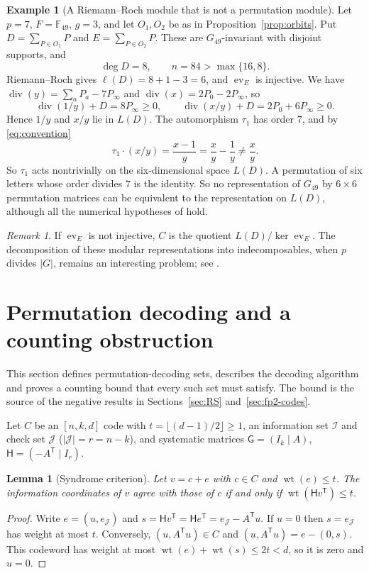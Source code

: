 \documentclass[12pt,letterpaper]{article}
\newtheorem{lemma}[theorem]{Lemma}
\theoremstyle{definition}
\newtheorem{example}[theorem]{Example}
\theoremstyle{remark}
\newtheorem{remark}[theorem]{Remark}
\numberwithin{equation}{section}
\newcommand{\F}{\mathbb{F}}
\newcommand{\ev}{\operatorname{ev}}
\newcommand{\wt}{\operatorname{wt}}
\newcommand{\Gsys}{\mathsf{G}}
\newcommand{\Hsys}{\mathsf{H}}
\newcommand{\cI}{\mathcal{I}}
\newcommand{\cJ}{\mathcal{J}}
\begin{document}
\begin{example}[A Riemann--Roch module that is not a permutation module]
\label{ex:not-permutation}
Let $p=7$, $F=\F_{49}$, $g=3$, and let $O_1,O_2$ be as in
Proposition~\ref{prop:orbits}.  Put $D=\sum_{P\in O_1}P$ and
$E=\sum_{P\in O_2}P$.  These are $G_{49}$-invariant with disjoint
supports, and
\[
\deg D=8,\qquad n=84>\max\{16,8\}.
\]
Riemann--Roch gives $\ell(D)=8+1-3=6$, and $\ev_E$ is injective.  We have
$\operatorname{div}(y)=\sum_aP_a-7P_\infty$ and
$\operatorname{div}(x)=2P_0-2P_\infty$, so
\[
\operatorname{div}(1/y)+D=8P_\infty\ge0,\qquad
\operatorname{div}(x/y)+D=2P_0+6P_\infty\ge0.
\]
Hence $1/y$ and $x/y$ lie in $L(D)$.  The automorphism $\tau_1$ has
order $7$, and by \eqref{eq:convention}
\[
\tau_1\cdot(x/y)=\frac{x-1}{y}=\frac xy-\frac1y\ne\frac xy.
\]
So $\tau_1$ acts nontrivially on the six-dimensional space $L(D)$.  A
permutation of six letters whose order divides $7$ is the identity.  So
no representation of $G_{49}$ by $6\times6$ permutation matrices can be
equivalent to the representation on $L(D)$, although all the numerical
hypotheses of \cite{Jo05} hold.
\end{example}

\begin{remark}
If $\ev_E$ is not injective, $C$ is the quotient $L(D)/\ker\ev_E$.  The
decomposition of these modular representations into indecomposables,
when $p$ divides $|G|$, remains an interesting problem; see
\cite{JK03,JT02,Sc90}.
\end{remark}

\section{Permutation decoding and a counting obstruction}\label{sec:PD}

This section defines permutation-decoding sets, describes the decoding
algorithm and proves a counting bound that every such set must satisfy.
The bound is the source of the negative results in
Sections~\ref{sec:RS} and~\ref{sec:fp2-codes}.

Let $C$ be an $[n,k,d]$ code with $t=\lfloor(d-1)/2\rfloor\ge1$, an
information set $\cI$ and check set $\cJ$ ($|\cJ|=r=n-k$), and systematic
matrices $\Gsys=(I_k\mid A)$, $\Hsys=(-A^{\mathsf T}\mid I_r)$.

\begin{lemma}[Syndrome criterion]\label{lem:syndrome}
Let $v=c+e$ with $c\in C$ and $\wt(e)\le t$.  The information coordinates
of $v$ agree with those of $c$ if and only if
$\wt(\Hsys v^{\mathsf T})\le t$.
\end{lemma}
\begin{proof}
Write $e=(u,e_\cJ)$ and $s=\Hsys v^{\mathsf T}=\Hsys e^{\mathsf T}
=e_\cJ-A^{\mathsf T}u$.  If $u=0$ then $s=e_\cJ$ has weight at most $t$.
Conversely, $(u,A^{\mathsf T}u)\in C$ and $(u,A^{\mathsf T}u)=e-(0,s)$.
This codeword has weight at most $\wt(e)+\wt(s)\le2t<d$, so it is zero
and $u=0$.
\end{proof}
\end{document}

